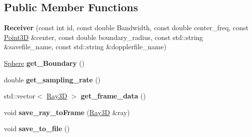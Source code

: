 \subsection*{Public Member Functions}
\begin{DoxyCompactItemize}
\item 
\hypertarget{class_receiver_a94a089e687b5320f02b3000304ffd08c}{}\label{class_receiver_a94a089e687b5320f02b3000304ffd08c} 
{\bfseries Receiver} (const int id, const double Bandwidth, const double center\+\_\+freq, const \hyperlink{class_point3_d}{Point3D} \&center, const double boundary\+\_\+radius, const std\+::string \&savefile\+\_\+name, const std\+::string \&dopplerfile\+\_\+name)
\item 
\hypertarget{class_receiver_a6d0f579d480c7303d8138981e546ff01}{}\label{class_receiver_a6d0f579d480c7303d8138981e546ff01} 
\hyperlink{class_sphere}{Sphere} {\bfseries get\+\_\+\+Boundary} ()
\item 
\hypertarget{class_receiver_a6e97969b694ba385a495bf64f9adc16a}{}\label{class_receiver_a6e97969b694ba385a495bf64f9adc16a} 
double {\bfseries get\+\_\+sampling\+\_\+rate} ()
\item 
\hypertarget{class_receiver_a146b5c800df5f2e17eb89faa16a3929a}{}\label{class_receiver_a146b5c800df5f2e17eb89faa16a3929a} 
std\+::vector$<$ \hyperlink{class_ray3_d}{Ray3D} $>$ {\bfseries get\+\_\+frame\+\_\+data} ()
\item 
\hypertarget{class_receiver_aaa3ac7cecd33cba5a382fb0db441082e}{}\label{class_receiver_aaa3ac7cecd33cba5a382fb0db441082e} 
void {\bfseries save\+\_\+ray\+\_\+to\+Frame} (\hyperlink{class_ray3_d}{Ray3D} \&ray)
\item 
\hypertarget{class_receiver_a72ce8129ebd0720a810959eb0a47dfc8}{}\label{class_receiver_a72ce8129ebd0720a810959eb0a47dfc8} 
void {\bfseries save\+\_\+to\+\_\+file} ()
\end{DoxyCompactItemize}
